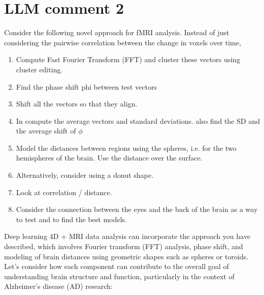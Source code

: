 \documentclass[twocolumn]{article}
\begin{document}
\section{LLM comment 2}
Consider the following novel approach for fMRI analysis. Instead of just considering the pairwise correlation between the change in voxels over time, 
\begin{enumerate}
\item Compute Fast Fourier Transform (FFT) and cluster these vectors using cluster editing. 
\item Find the phase shift phi between test vectors
\item Shift all the vectors so that they align.
\item In compute the average vectors and standard deviations. also find the SD and the average shift of $\phi$

\item Model the distances between regions using the spheres, i.e. for the two hemispheres of the brain. Use the distance over the surface. 

\item Alternatively, consider using a donut shape. 
\item Look at correlation / distance.
\item Consider the connection between the eyes and the back of the brain as a way to test and to find the best models.
\end{enumerate}
Deep learning 4D + MRI data analysis can incorporate the approach you have described, which involves Fourier transform (FFT) analysis, phase
shift, and modeling of brain distances using geometric shapes such as spheres or toroids. Let's consider how each component can contribute to the overall goal of understanding brain structure and function, particularly in the context of Alzheimer's disease (AD) research:
\end{document}
